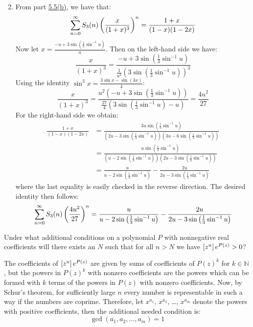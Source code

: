 \begin{solution}
\begin{enumerate}[label=(\alph*)]
\[        \]
        \item From part \hyperlink{eq:ch5:5:b}{5.5(b)}, we have that:
        \[
            \bsum[n] S_3(n) \left(\frac{x}{(1+x)^3}\right)^n = \frac{1+x}{(1-x)(1-2x)}
        \]
        Now let $x = \frac{-u + 3 \sin\left(\frac{1}{3}\sin^{-1}u \right)}{u}$. Then on the left-hand side we have:
        \[
            \frac{x}{(1+x)^3} = \frac{-u + 3 \sin\left(\frac{1}{3}\sin^{-1}u\right)}{\frac{1}{u^2}\left(3\sin\left(\frac{1}{3}\sin^{-1}u\right)\right)^3}
        \]
        Using the identity $\sin^3 x = \frac{3\sin x - \sin(3x)}{4}$:
        \[
            \frac{x}{(1+x)^3} = \frac{u^2\left(-u + 3 \sin\left(\frac{1}{3}\sin^{-1}u\right)\right)}{\frac{27}{4}\left(3\sin\left(\frac{1}{3}\sin^{-1}u\right) - u\right)} = \frac{4u^2}{27}
        \]
        For the right-hand side we obtain:
        \begin{align*}
            \frac{1+x}{(1-x)(1-2x)} &= \frac{3u\sin\left(\frac{1}{3}\sin^{-1}u\right)}{\left(2u - 3\sin\left(\frac{1}{3}\sin^{-1}u\right)\right)\left(3u - 6\sin\left(\frac{1}{3}\sin^{-1}u\right)\right)} \\
            &= \frac{u\sin\left(\frac{1}{3}\sin^{-1}u\right)}{\left(u - 2\sin\left(\frac{1}{3}\sin^{-1}u\right)\right)\left(2u - 3\sin\left(\frac{1}{3}\sin^{-1}u\right)\right)} \\
            &= \frac{u}{u-2\sin\left(\frac{1}{3}\sin^{-1} u\right)} - \frac{2u}{2u-3\sin\left(\frac{1}{3}\sin^{-1} u\right)}
        \end{align*}
        where the last equality is easily checked in the reverse direction. The desired identity then follows:
        \[
            \bsum[n] S_3(n)\left(\frac{4u^2}{27}\right)^n = \frac{u}{u-2\sin\left(\frac{1}{3}\sin^{-1} u\right)} - \frac{2u}{2u-3\sin\left(\frac{1}{3}\sin^{-1} u\right)}
        \]
    \end{enumerate}
\end{solution}

\begin{exercise}
    \label{ex:5-6}
    Under what additional conditions on a polynomial $P$ with nonnegative real coefficients will there exists an $N$ such that for all $n>N$ we have $\coeff{z^n}e^{P(z)}>0$?
\end{exercise}
\begin{solution}
    The coefficients of $\coeff{z^n}e^{P(z)}$ are given by sums of coefficients of $P(z)^k$ for $k\in \mathbb{N}$, but the powers in $P(z)^k$ with nonzero coefficients are the powers which can be formed with $k$ terms of the powers in $P(z)$ with nonzero coefficients. Now, by Schur's theorem, for sufficiently large $n$ every number is representable in such a way if the numbers are coprime. Therefore, let $x^{a_1}$, $x^{a_2}$, \ldots, $x^{a_m}$ denote the powers with positive coefficients, then the additional needed condition is:
    \[
        \gcd(a_1, a_2, \ldots, a_m) = 1
    \]
\end{solution}

